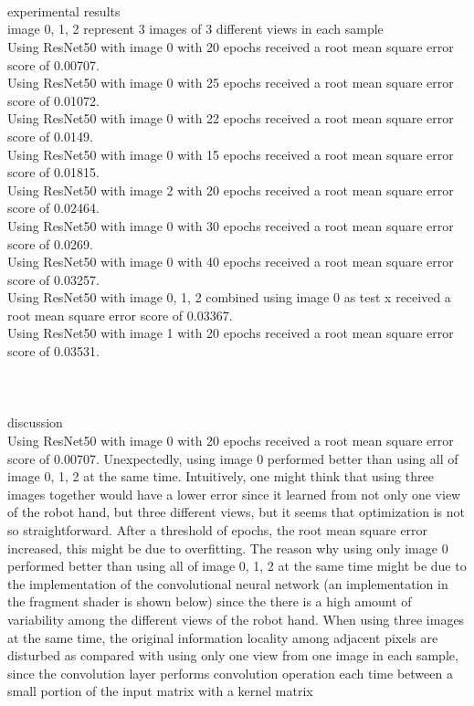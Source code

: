 \documentclass[12pt, border = 4pt, multi]{article} %
\begin{document}
\leavevmode
\noindent
\\
\\
\\
experimental results\\
image 0, 1, 2 represent 3 images of 3 different views in each sample\\
Using ResNet50 with image 0 with 20 epochs received a root mean square error score of 0.00707.\\
Using ResNet50 with image 0 with 25 epochs received a root mean square error score of 0.01072.\\
Using ResNet50 with image 0 with 22 epochs received a root mean square error score of 0.0149.\\
Using ResNet50 with image 0 with 15 epochs received a root mean square error score of 0.01815.\\
Using ResNet50 with image 2 with 20 epochs received a root mean square error score of 0.02464.\\
Using ResNet50 with image 0 with 30 epochs received a root mean square error score of 0.0269.\\
Using ResNet50 with image 0 with 40 epochs received a root mean square error score of 0.03257.\\
Using ResNet50 with image 0, 1, 2 combined using image 0 as test x received a root mean square error score of 0.03367.\\
Using ResNet50 with image 1 with 20 epochs received a root mean square error score of 0.03531.\\
\\
\\
\\
discussion\\
Using ResNet50 with image 0 with 20 epochs received a root mean square error score of 0.00707. Unexpectedly, using image 0 performed better than using all of image 0, 1, 2 at the same time. Intuitively, one might think that using three images together would have a lower error since it learned from not only one view of the robot hand, but three different views, but it seems that optimization is not so straightforward. After a threshold of epochs, the root mean square error increased, this might be due to overfitting. The reason why using only image 0 performed better than using all of image 0, 1, 2 at the same time might be due to the implementation of the convolutional neural network (an implementation in the fragment shader is shown below) since the there is a high amount of variability among the different views of the robot hand. When using three images at the same time, the original information locality among adjacent pixels are disturbed as compared with using only one view from one image in each sample, since the convolution layer performs convolution operation each time between a small portion of the input matrix with a kernel matrix
\end{document}

